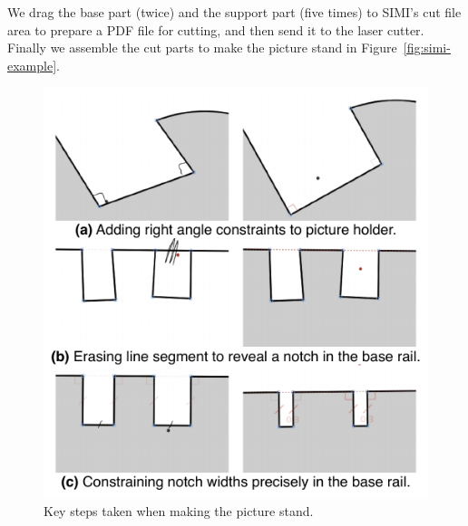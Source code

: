 We drag the base part (twice) and the support part (five times) to
SIMI’s cut file area to prepare a PDF file for cutting, and then send
it to the laser cutter.  Finally we assemble the cut parts to make the
picture stand in Figure~\ref{fig:simi-example}.

\begin{figure}[h]
  \centering
  \includegraphics{img/motivating-example.pdf}
  \caption{Key steps taken when making the picture stand.}
  \label{fig:motivating}
\end{figure}




